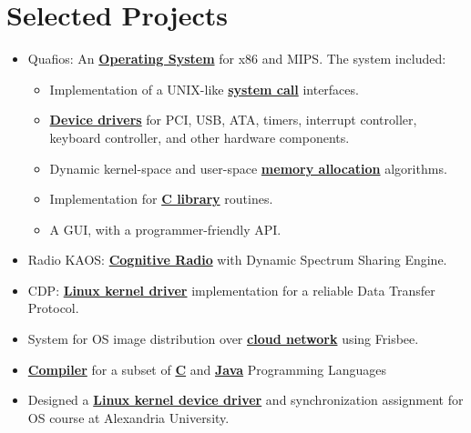 \documentclass[letterpaper]{twentysecondcv} %
\begin{document}

\section{Selected Projects}

\begin{itemize}
    \item{Quafios: An \textbf{\underline{Operating System}} for x86 and MIPS. The system included:
          \begin{itemize}
            \item Implementation of a UNIX-like \textbf{\underline{system call}} interfaces.
            \item \textbf{\underline{Device drivers}} for PCI, USB, ATA, timers, interrupt controller,
                  keyboard controller, and other hardware components.
            \item Dynamic kernel-space and user-space \textbf{\underline{memory allocation}} algorithms.
            \item Implementation for \textbf{\underline{C library}} routines.
            \item A GUI, with a programmer-friendly API.
          \end{itemize}
          }
    \item{Radio KAOS: \textbf{\underline{Cognitive Radio}} with Dynamic Spectrum Sharing Engine.}
    \item{CDP: \textbf{\underline{Linux kernel driver}} implementation for a reliable Data Transfer Protocol.}
    \item{System for OS image distribution over \textbf{\underline{cloud network}} using Frisbee.} 
    \item{\textbf{\underline{Compiler}} for a subset of \textbf{\underline{C}} and
          \textbf{\underline{Java}} Programming Languages}
    \item{Designed a \textbf{\underline{Linux kernel device driver}} and synchronization assignment
          for OS course at Alexandria University.}

\end{itemize}
\end{document}
